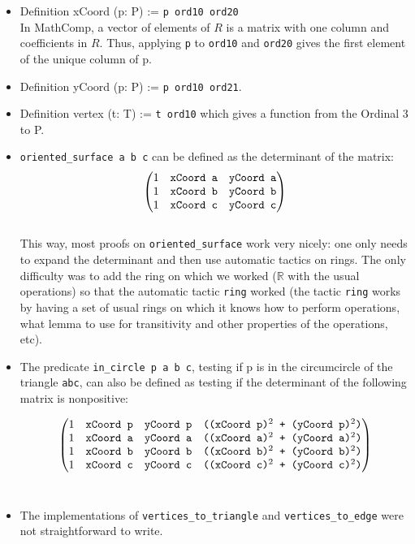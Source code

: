 \documentclass[a4paper,10pt]{article}
\def\definition#1#2{{\color{purple}Definition} {\color{blue}#1} := {\tt #2}}
\begin{document}
 \begin{itemize}
  \item \definition{xCoord (p: P)}{p ord10 ord20} \\In {\sc MathComp}, a vector of elements of $R$ is a matrix with one column and coefficients in $R$. Thus, applying {\tt p} to {\tt ord10} and {\tt ord20} gives the first element of the unique column of p.
  \item \definition{yCoord (p: P)}{p ord10 ord21}.
   \item \definition{vertex (t: T)}{t ord10} which gives a function from the Ordinal 3 to P.
\item {\tt oriented\_surface a b c} \label{oriented_surface} can be defined as the determinant of the matrix:
  $$ \left( \begin{matrix}
1 & \text{{\tt xCoord  a}} & \text{{\tt yCoord  a}}\\
1 & \text{{\tt xCoord  b}} & \text{{\tt yCoord  b}}\\
1 & \text{{\tt xCoord  c}} & \text{{\tt yCoord  c}}
\end{matrix} \right) $$\\
This way, most proofs on {\tt oriented\_surface} work very nicely: one only needs to expand the determinant and then use automatic tactics on rings. The only difficulty was to add the ring on which we worked ($\mathbb{R}$ with the usual operations) so that the automatic tactic {\tt ring} worked (the tactic {\tt ring} works by having a set of usual rings on which it knows how to perform operations, what lemma to use for transitivity and other properties of the operations, etc).

\item The predicate {\tt in\_circle p a b c}, testing if p is in the circumcircle of the triangle {\tt abc}, can also be defined as testing if the determinant of the following matrix is nonpositive:

  $$\left( \begin{matrix}
1 & \text{{\tt xCoord  p}} & \text{{\tt yCoord  p}}& \text{{\tt ((xCoord  p)$^2$ + (yCoord  p)$^2$)}}\\
1 & \text{{\tt xCoord  a}} & \text{{\tt yCoord  a}}& \text{{\tt ((xCoord  a)$^2$ + (yCoord  a)$^2$)}}\\
1 & \text{{\tt xCoord  b}} & \text{{\tt yCoord  b}}& \text{{\tt ((xCoord  b)$^2$ + (yCoord  b)$^2$)}}\\
1 & \text{{\tt xCoord  c}} & \text{{\tt yCoord  c}}& \text{{\tt ((xCoord  c)$^2$ + (yCoord  c)$^2$)}}
\end{matrix} \right) $$\\
\item The implementations of {\tt vertices\_to\_triangle} and {\tt vertices\_to\_edge} were not straightforward to write.


\end{itemize}
\end{document}
